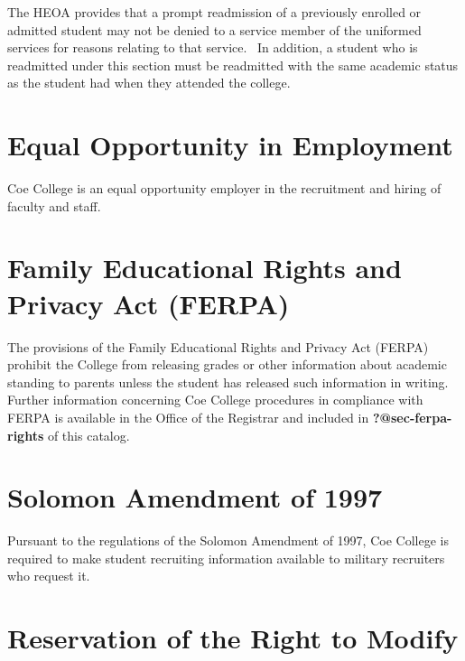\documentclass[
  letterpaper,
]{scrbook}
\begin{document}
The HEOA provides that a prompt readmission of a previously enrolled or
admitted student may not be denied to a service member of the uniformed
services for reasons relating to that service.~ In addition, a student
who is readmitted under this section must be readmitted with the same
academic status as the student had when they attended the college.

\section*{Equal Opportunity in
Employment}\label{equal-opportunity-in-employment}


Coe College is an equal opportunity employer in the recruitment and
hiring of faculty and staff.

\section*{Family Educational Rights and Privacy Act
(FERPA)}\label{family-educational-rights-and-privacy-act-ferpa}


The provisions of the Family Educational Rights and Privacy Act (FERPA)
prohibit the College from releasing grades or other information about
academic standing to parents unless the student has released such
information in writing. Further information concerning Coe College
procedures in compliance with FERPA is available in the Office of the
Registrar and included in \textbf{?@sec-ferpa-rights} of this catalog.

\section*{Solomon Amendment of 1997}\label{solomon-amendment-of-1997}


Pursuant to the regulations of the Solomon Amendment of 1997, Coe
College is required to make student recruiting information available to
military recruiters who request it.

\section*{Reservation of the Right to
Modify}\label{reservation-of-the-right-to-modify}
\end{document}
